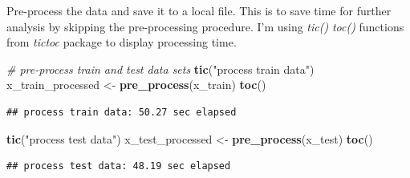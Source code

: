 \documentclass[]{article}
\newenvironment{Shaded}{\begin{snugshade}}{\end{snugshade}}
\newcommand{\CommentTok}[1]{\textcolor[rgb]{0.56,0.35,0.01}{\textit{#1}}}
\newcommand{\ControlFlowTok}[1]{\textcolor[rgb]{0.13,0.29,0.53}{\textbf{#1}}}
\newcommand{\DataTypeTok}[1]{\textcolor[rgb]{0.13,0.29,0.53}{#1}}
\newcommand{\KeywordTok}[1]{\textcolor[rgb]{0.13,0.29,0.53}{\textbf{#1}}}
\newcommand{\NormalTok}[1]{#1}
\newcommand{\OperatorTok}[1]{\textcolor[rgb]{0.81,0.36,0.00}{\textbf{#1}}}
\newcommand{\StringTok}[1]{\textcolor[rgb]{0.31,0.60,0.02}{#1}}
\begin{document}
Pre-process the data and save it to a local file. This is to save time
for further analysis by skipping the pre-processing procedure. I'm using
\emph{tic()} \emph{toc()} functions from \emph{tictoc} package to
display processing time.

\begin{Shaded}
\begin{Highlighting}[]
\CommentTok{# pre-process train and test data sets}
\KeywordTok{tic}\NormalTok{(}\StringTok{"process train data"}\NormalTok{)}
\NormalTok{x_train_processed <-}\StringTok{ }\KeywordTok{pre_process}\NormalTok{(x_train)}
\KeywordTok{toc}\NormalTok{()}
\end{Highlighting}
\end{Shaded}

\begin{verbatim}
## process train data: 50.27 sec elapsed
\end{verbatim}

\begin{Shaded}
\begin{Highlighting}[]
\KeywordTok{tic}\NormalTok{(}\StringTok{"process test data"}\NormalTok{)}
\NormalTok{x_test_processed <-}\StringTok{ }\KeywordTok{pre_process}\NormalTok{(x_test)}
\KeywordTok{toc}\NormalTok{()}
\end{Highlighting}
\end{Shaded}

\begin{verbatim}
## process test data: 48.19 sec elapsed
\end{verbatim}

\begin{Shaded}
\end{Shaded}
\end{document}
